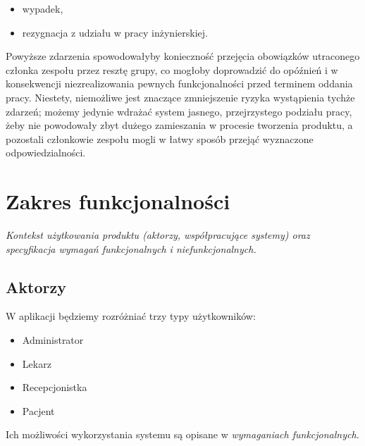 \documentclass[polish,12pt]{aghthesis}
\begin{document}
\begin{itemize}
\begin{itemize}
      \item wypadek,
      \item rezygnacja z udziału w pracy inżynierskiej.
  \end{itemize}
  Powyższe zdarzenia spowodowałyby konieczność przejęcia obowiązków utraconego członka zespołu przez resztę grupy, co mogłoby doprowadzić do opóźnień i w konsekwencji niezrealizowania pewnych funkcjonalności przed terminem oddania pracy. Niestety, niemożliwe jest znaczące zmniejszenie ryzyka wystąpienia tychże zdarzeń; możemy jedynie wdrażać system jasnego, przejrzystego podziału pracy, żeby nie powodowały zbyt dużego zamieszania w procesie tworzenia produktu, a pozostali członkowie zespołu mogli w łatwy sposób przejąć wyznaczone odpowiedzialności.
\end{itemize}
\section{Zakres funkcjonalności}
\label{sec:zakres-funkcjonalnosci}

\emph{Kontekst użytkowania produktu (aktorzy, współpracujące systemy)
  oraz specyfikacja wymagań funkcjonalnych i niefunkcjonalnych.}
  
\subsection{Aktorzy}
W aplikacji będziemy rozróżniać trzy typy użytkowników:
\begin{itemize}
    \item Administrator
    \item Lekarz
    \item Recepcjonistka
    \item Pacjent
\end{itemize}
Ich możliwości wykorzystania systemu są opisane w \emph{wymaganiach funkcjonalnych}. 
\end{document}
